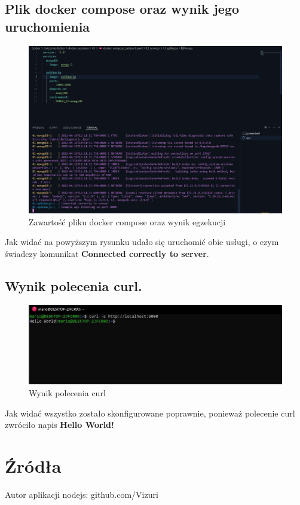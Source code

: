\documentclass[12pt, a4paper]{article}
\begin{document}
    \subsection{Plik docker compose oraz wynik jego uruchomienia}
        \begin{figure}[!h]
            \centering
            \includegraphics[width=\textwidth]{docker-compose.JPG}
            \caption{Zawartość pliku docker compose oraz wynik egzekucji}
            \label{fig:dockercompose}
        \end{figure}
        Jak widać na powyższym rysunku udało się uruchomić obie usługi, o czym świadczy komunikat \textbf{Connected correctly to server}.
    \subsection{Wynik polecenia curl.}
        \begin{figure}[!h]
            \centering
            \includegraphics[width=\textwidth]{curl.JPG}
            \caption{Wynik polecenia curl}
            \label{fig:curl}
        \end{figure}
        Jak widać wszystko zostało skonfigurowane poprawnie, ponieważ polecenie curl zwróciło napis \textbf{Hello World!}
    \section{Źródła}
    Autor aplikacji nodejs: github.com/Vizuri
\end{document}
